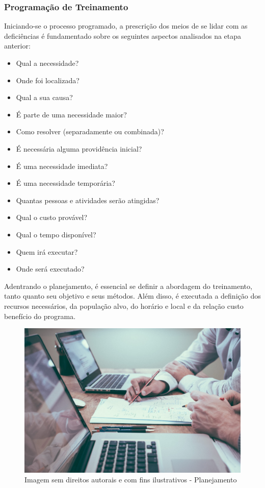 \documentclass[12pt]{article}
\begin{document}
\subsubsection{Programação de Treinamento}
Iniciando-se o processo programado, a prescrição dos meios de se lidar com as deficiências é fundamentado sobre os seguintes aspectos analisados na etapa anterior: 
\begin{itemize}
\item Qual a necessidade?
\item Onde foi localizada?
\item Qual a sua causa?
\item É parte de uma necessidade maior?
\item Como resolver (separadamente ou combinada)?
\item É necessária alguma providência inicial?
\item É uma necessidade imediata?
\item É uma necessidade temporária?
\item Quantas pessoas e atividades serão atingidas?
\item Qual o custo provável?
\item Qual o tempo disponível?
\item Quem irá executar?
\item Onde será executado?
\end{itemize}

Adentrando o planejamento, é essencial se definir a abordagem do treinamento, tanto quanto seu objetivo e seus métodos. Além disso, é executada a definição dos recursos necessários, da população alvo, do horário e local e da relação custo benefício do programa.

\newpage

\begin{figure}[h]
	\centering
	\includegraphics[width=1.0\textwidth]{build/images/planejamento}
	\caption{Imagem sem direitos autorais e com fins ilustrativos - Planejamento}
\end{figure}
\end{document}
